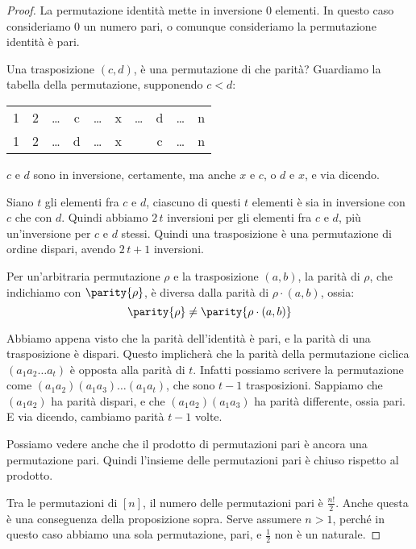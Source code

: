 \begin{proof}
La permutazione identit\`a mette in inversione 0 elementi.
In questo caso consideriamo 0 un numero pari, o comunque consideriamo la permutazione identit\`a \`e pari.

Una trasposizione $(c,d)$, \`e una permutazione di che parit\`a?
Guardiamo la tabella della permutazione, supponendo $c < d$:

\begin{tabular}{*{10}{c}}
	1 & 2 & \dots & c & \dots & x & \dots & d & \dots & n \\
	1 & 2 & \dots & d & \dots & x &  & c & \dots & n
\end{tabular}

$c$ e $d$ sono in inversione, certamente, ma anche $x$ e $c$, o $d$ e $x$, e via dicendo.

Siano $t$ gli elementi fra $c$ e $d$, ciascuno di questi $t$ elementi \`e sia in inversione con $c$ che con $d$.
Quindi abbiamo $2 \, t$ inversioni per gli elementi fra $c$ e $d$, pi\`u un'inversione per $c$ e $d$ stessi.
Quindi una trasposizione \`e una permutazione di ordine dispari, avendo $2 \, t + 1$ inversioni.

\begin{prop}
	Per un'arbitraria permutazione $\rho$ e la trasposizione $(a,b)$, la parit\`a di $\rho$, che indichiamo con $\parity{\rho}$, \`e diversa dalla parit\`a di $\rho \cdot (a,b)$, ossia:
	\[
		\parity{\rho} \neq \parity{\rho \cdot (a,b)}
	\]
\end{prop}
Abbiamo appena visto che la parit\`a dell'identit\`a \`e pari, e la parit\`a di una trasposizione \`e dispari.
Questo implicher\`a che la parit\`a della permutazione ciclica $(a_1 a_2 \dots a_t)$ \`e opposta alla parit\`a di $t$.
Infatti possiamo scrivere la permutazione come $(a_1 a_2) (a_1 a_3) \dots (a_1 a_t)$, che sono $t-1$ trasposizioni.
Sappiamo che $(a_1 a_2)$ ha parit\`a dispari, e che $(a_1 a_2) (a_1 a_3)$ ha parit\`a differente, ossia pari.
E via dicendo, cambiamo parit\`a $t-1$ volte.

Possiamo vedere anche che il prodotto di permutazioni pari \`e ancora una permutazione pari.
Quindi l'insieme delle permutazioni pari \`e chiuso rispetto al prodotto.

Tra le permutazioni di $[n]$, il numero delle permutazioni pari \`e $\frac{n!}{2}$.
Anche questa \`e una conseguenza della proposizione sopra.
Serve assumere $n > 1$, perch\'e in questo caso abbiamo una sola permutazione, pari, e $\frac{1}{2}$ non \`e un naturale.


\end{proof}
